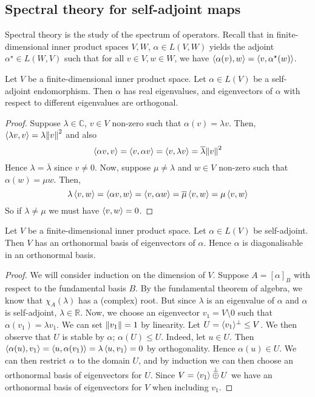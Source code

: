 \subsection{Spectral theory for self-adjoint maps}
Spectral theory is the study of the spectrum of operators.
Recall that in finite-dimensional inner product spaces \( V, W \), \( \alpha \in L(V, W) \) yields the adjoint \( \alpha^\star \in L(W, V) \) such that for all \( v \in V, w \in W \), we have \( \left\langle{\alpha(v), w}\right\rangle = \left\langle{v, \alpha^\star(w)}\right\rangle \).
\begin{lemma}
	Let \( V \) be a finite-dimensional inner product space.
	Let \( \alpha \in L(V) \) be a self-adjoint endomorphism.
	Then \( \alpha \) has real eigenvalues, and eigenvectors of \( \alpha \) with respect to different eigenvalues are orthogonal.
\end{lemma}
\begin{proof}
	Suppose \( \lambda \in \mathbb C \), \( v \in V \) non-zero such that \( \alpha(v) = \lambda v \).
	Then, \( \left\langle{\lambda v, v}\right\rangle = \lambda \norm{v}^2 \) and also
	\[
		\left\langle{\alpha v, v}\right\rangle = \left\langle{v, \alpha v}\right\rangle = \left\langle{v, \lambda v}\right\rangle = \overline{\lambda} \norm{v}^2
	\]
	Hence \( \lambda = \overline{\lambda} \) since \( v \neq 0 \).
	Now, suppose \( \mu \neq \lambda \) and \( w \in V \) non-zero such that \( \alpha(w) = \mu w \).
	Then,
	\[
		\lambda \left\langle{v, w}\right\rangle = \left\langle{\alpha v, w}\right\rangle = \left\langle{v, \alpha w}\right\rangle = \overline{\mu} \left\langle{v, w}\right\rangle = \mu \left\langle{v,w}\right\rangle
	\]
	So if \( \lambda \neq \mu \) we must have \( \left\langle{v,w}\right\rangle = 0 \).
\end{proof}
\begin{theorem}
	Let \( V \) be a finite-dimensional inner product space.
	Let \( \alpha \in L(V) \) be self-adjoint.
	Then \( V \) has an orthonormal basis of eigenvectors of \( \alpha \).
	Hence \( \alpha \) is diagonalisable in an orthonormal basis.
\end{theorem}
\begin{proof}
	We will consider induction on the dimension of \( V \).
	Suppose \( A = [\alpha]_B \) with respect to the fundamental basis \( B \).
	By the fundamental theorem of algebra, we know that \( \chi_A(\lambda) \) has a (complex) root.
	But since \( \lambda \) is an eigenvalue of \( \alpha \) and \( \alpha \) is self-adjoint, \( \lambda \in \mathbb R \).
	Now, we choose an eigenvector \( v_1 = V \setminus \qty{0} \) such that \( \alpha(v_1) = \lambda v_1 \).
	We can set \( \norm{v_1} = 1 \) by linearity.
	Let \( U = \langle{} v_1 \rangle^\perp \leq V \).
	We then observe that \( U \) is stable by \( \alpha \); \( \alpha(U) \leq U \).
	Indeed, let \( u \in U \).
	Then \( \left\langle{\alpha(u), v_1}\right\rangle = \left\langle{u, \alpha(v_1)}\right\rangle = \lambda \left\langle{u, v_1}\right\rangle = 0 \) by orthogonality.
	Hence \( \alpha(u) \in U \).
	We can then restrict \( \alpha \) to the domain \( U \), and by induction we can then choose an orthonormal basis of eigenvectors for \( U \).
	Since \( V = \langle{} v_1 \rangle \overset{\perp}{\oplus} U \) we have an orthonormal basis of eigenvectors for \( V \) when including \( v_1 \).
\end{proof}

